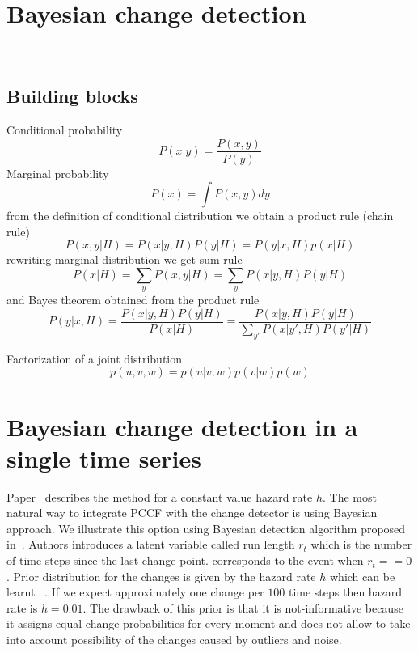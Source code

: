 \section{Bayesian change detection}
~\cite{DowneyChp}
~\cite{MacKay_Inference_Book}
~\cite{gelman2013bayesian}
\subsection{Building blocks}
Conditional probability
\begin{equation} \label{eq:conditional_probability}
P(x|y) = \frac{P(x,y)}{P(y)}
\end{equation}
Marginal probability
\begin{equation}
P(x) = \int P(x,y) dy
\end{equation}
from the definition of conditional distribution we obtain a product rule
(chain rule)
\begin{equation}
P(x,y|H) = P(x|y,H) P(y|H) = P(y|x,H) p(x|H)
\end{equation}
rewriting marginal distribution we get sum rule
\begin{equation}
P(x|H) = \sum_y P(x,y|H) = \sum_y P(x|y,H)P(y|H)
\end{equation}
and Bayes theorem obtained from the product rule
\begin{equation}
P(y|x,H) = \frac{P(x|y,H) P(y|H)}{P(x|H)} = \frac{P(x|y,H) P(y|H)}{ \sum_{y'} P(x|y',H) P(y'|H) }
\end{equation}

Factorization of a joint distribution
\[
p(u,v,w) = p(u|v,w)p(v|w)p(w)
\]

\section{Bayesian \online change detection in a single time series}
Paper~\cite{mackay2007} describes the method for a constant value hazard rate $h$.
The most natural way to integrate PCCF with the change detector is using Bayesian approach.
We illustrate this option using Bayesian \online \changepoint detection algorithm proposed in~\cite{mackay2007}.
Authors introduces a latent variable called run length $r_t$ which is the number of time steps since the last change point.
\Changepoint corresponds to the event when $r_t == 0$.
Prior distribution for the changes is given by the hazard rate $h$ which can be learnt \online~\cite{Wilson2010a}.
If we expect approximately one change per $100$ time steps then hazard rate is $h = 0.01$.
The drawback of this prior is that it is not-informative because it assigns equal change probabilities for every moment and does not allow to take into account possibility of the changes caused by outliers and noise.

